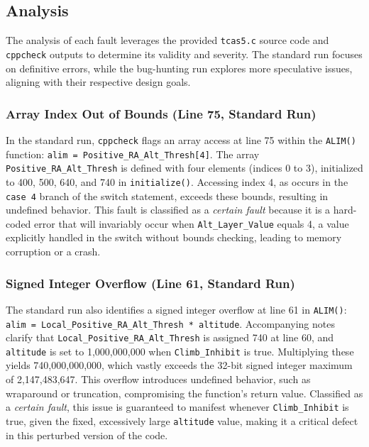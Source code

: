 \documentclass[conference]{IEEEtran}
\begin{document}
\subsection{Analysis}
The analysis of each fault leverages the provided \texttt{tcas5.c} source code and \texttt{cppcheck} outputs to determine its validity and severity. The standard run focuses on definitive errors, while the bug-hunting run explores more speculative issues, aligning with their respective design goals.

\subsubsection{Array Index Out of Bounds (Line 75, Standard Run)}
In the standard run, \texttt{cppcheck} flags an array access at line 75 within the \texttt{ALIM()} function: \texttt{alim = Positive\_RA\_Alt\_Thresh[4]}. The array \texttt{Positive\_RA\_Alt\_Thresh} is defined with four elements (indices 0 to 3), initialized to 400, 500, 640, and 740 in \texttt{initialize()}. Accessing index 4, as occurs in the \texttt{case 4} branch of the switch statement, exceeds these bounds, resulting in undefined behavior. This fault is classified as a \textit{certain fault} because it is a hard-coded error that will invariably occur when \texttt{Alt\_Layer\_Value} equals 4, a value explicitly handled in the switch without bounds checking, leading to memory corruption or a crash.

\subsubsection{Signed Integer Overflow (Line 61, Standard Run)}
The standard run also identifies a signed integer overflow at line 61 in \texttt{ALIM()}: \texttt{alim = Local\_Positive\_RA\_Alt\_Thresh * altitude}. Accompanying notes clarify that \texttt{Local\_Positive\_RA\_Alt\_Thresh} is assigned 740 at line 60, and \texttt{altitude} is set to 1,000,000,000 when \texttt{Climb\_Inhibit} is true. Multiplying these yields 740,000,000,000, which vastly exceeds the 32-bit signed integer maximum of 2,147,483,647. This overflow introduces undefined behavior, such as wraparound or truncation, compromising the function’s return value. Classified as a \textit{certain fault}, this issue is guaranteed to manifest whenever \texttt{Climb\_Inhibit} is true, given the fixed, excessively large \texttt{altitude} value, making it a critical defect in this perturbed version of the code.
\end{document}
